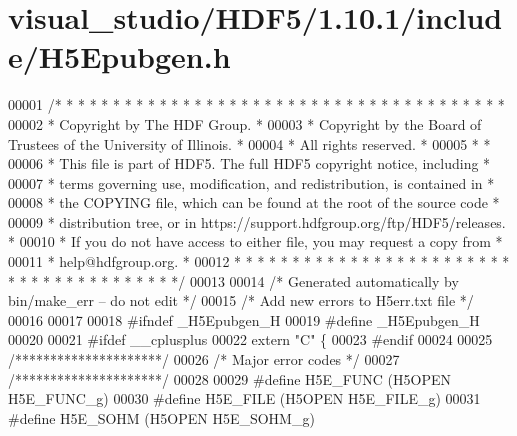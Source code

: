 \hypertarget{visual__studio_2_h_d_f5_21_810_81_2include_2_h5_epubgen_8h_source}{}\section{visual\+\_\+studio/\+H\+D\+F5/1.10.1/include/\+H5\+Epubgen.h}
\label{visual__studio_2_h_d_f5_21_810_81_2include_2_h5_epubgen_8h_source}

\begin{DoxyCode}
00001 \textcolor{comment}{/* * * * * * * * * * * * * * * * * * * * * * * * * * * * * * * * * * * * * * *}
00002 \textcolor{comment}{ * Copyright by The HDF Group.                                               *}
00003 \textcolor{comment}{ * Copyright by the Board of Trustees of the University of Illinois.         *}
00004 \textcolor{comment}{ * All rights reserved.                                                      *}
00005 \textcolor{comment}{ *                                                                           *}
00006 \textcolor{comment}{ * This file is part of HDF5.  The full HDF5 copyright notice, including     *}
00007 \textcolor{comment}{ * terms governing use, modification, and redistribution, is contained in    *}
00008 \textcolor{comment}{ * the COPYING file, which can be found at the root of the source code       *}
00009 \textcolor{comment}{ * distribution tree, or in https://support.hdfgroup.org/ftp/HDF5/releases.  *}
00010 \textcolor{comment}{ * If you do not have access to either file, you may request a copy from     *}
00011 \textcolor{comment}{ * help@hdfgroup.org.                                                        *}
00012 \textcolor{comment}{ * * * * * * * * * * * * * * * * * * * * * * * * * * * * * * * * * * * * * * */}
00013 
00014 \textcolor{comment}{/* Generated automatically by bin/make\_err -- do not edit */}
00015 \textcolor{comment}{/* Add new errors to H5err.txt file */}
00016 
00017 
00018 \textcolor{preprocessor}{#ifndef \_H5Epubgen\_H}
00019 \textcolor{preprocessor}{#define \_H5Epubgen\_H}
00020 
00021 \textcolor{preprocessor}{#ifdef \_\_cplusplus}
00022 \textcolor{keyword}{extern} \textcolor{stringliteral}{"C"} \{
00023 \textcolor{preprocessor}{#endif}
00024 
00025 \textcolor{comment}{/*********************/}
00026 \textcolor{comment}{/* Major error codes */}
00027 \textcolor{comment}{/*********************/}
00028 
00029 \textcolor{preprocessor}{#define H5E\_FUNC             (H5OPEN H5E\_FUNC\_g)}
00030 \textcolor{preprocessor}{#define H5E\_FILE             (H5OPEN H5E\_FILE\_g)}
00031 \textcolor{preprocessor}{#define H5E\_SOHM             (H5OPEN H5E\_SOHM\_g)}

\end{DoxyCode}
